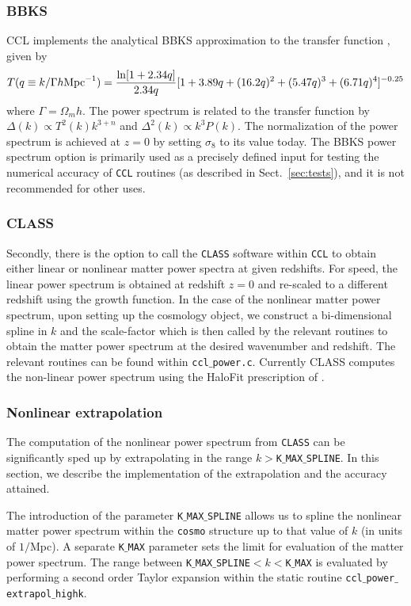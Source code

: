 \documentclass[\docopts]{\docclass}
\begin{document}
\subsubsection{BBKS}
CCL implements the analytical BBKS approximation to the transfer function \citep{BBKS}, given by
\begin{equation}
T(q\equiv k/\Gamma h {\rm Mpc}^{-1}) = \frac{\ln[1+2.34q]}{2.34q}[1+3.89q+(16.2q)^2+(5.47q)^3+(6.71q)^4]^{-0.25}
\end{equation}
where $\Gamma = \Omega_m h$.
The power spectrum is related to the transfer function by $\Delta(k)\propto T^2(k)k^{3+n}$ and $\Delta^2(k)\propto k^3P(k)$. The normalization of the power spectrum is achieved at $z=0$ by setting $\sigma_8$ to its value today.
The BBKS power spectrum option is primarily used as a precisely defined input for testing the numerical accuracy of {\tt CCL} routines (as described in Sect.~\ref{sec:tests}), and it is not recommended for other uses.

\subsubsection{CLASS}
Secondly, there is the option to call the {\tt CLASS} software \citep{class} within {\tt CCL} to obtain either linear or nonlinear matter power spectra at given redshifts. For speed, the linear power spectrum is obtained at redshift $z=0$ and re-scaled to a different redshift using the growth function. In the case of the nonlinear matter power spectrum, upon setting up the cosmology object, we construct a bi-dimensional spline in $k$ and the scale-factor which is then called by the relevant routines to obtain the matter power spectrum at the desired wavenumber and redshift. The relevant routines can be found within {\tt ccl$\_$power.c}. Currently CLASS computes the non-linear power spectrum using the HaloFit prescription of \cite{CLASS_halofit}.

\subsubsection{Nonlinear extrapolation}
\label{sec:NLextrapol}

The computation of the nonlinear power spectrum from {\tt CLASS} can be significantly sped up by extrapolating in the range $k>${\tt K$\_$MAX$\_$SPLINE}. In this section, we describe the implementation of the extrapolation and the accuracy attained.

The introduction of the parameter {\tt K$\_$MAX$\_$SPLINE} allows us to spline the nonlinear matter power spectrum within the {\tt cosmo} structure up to that value of $k$ (in units of $1/$Mpc). A separate {\tt K$\_$MAX} parameter sets the limit for evaluation of the matter power spectrum. The range between {\tt K$\_$MAX$\_$SPLINE}$<k<${\tt K$\_$MAX} is evaluated by performing a second order Taylor expansion within the static routine {\tt ccl$\_$power$\_$extrapol$\_$highk}.
\end{document}
